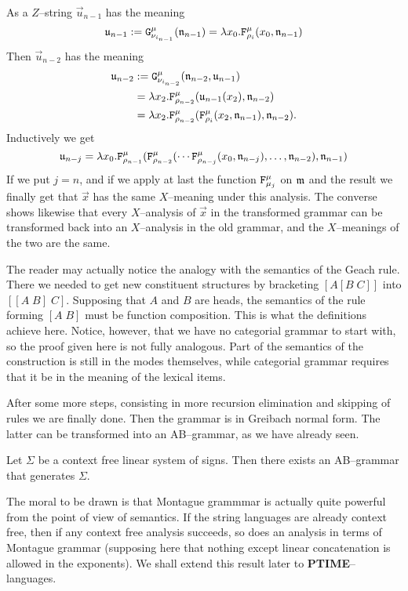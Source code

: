 As a $Z$--string $\vec{u}_{n-1}$ has the meaning
\begin{equation}
\mathfrak{u}_{n-1} :=
    \mbox{\tt G}^{\mu}_{\nu_{i_{n-1}}}(\mathfrak{n}_{n-1}) =
    \lambda x_0.\mbox{\tt F}^{\mu}_{\rho_i}(x_0, \mathfrak{n}_{n-1}) 
\end{equation}
Then $\vec{u}_{n-2}$ has the meaning
\begin{align}
\begin{split}
\Gu_{n-2} & := \mbox{\tt G}^{\mu}_{\nu_{i_{n-2}}}(\Gn_{n-2},\Gu_{n-1}) \\
    & = \lambda x_2.\mbox{\tt F}^{\mu}_{\rho_{n-2}}(\Gu_{n-1}(x_2),
        \Gn_{n-2}) \\
    & = \lambda x_2.\mbox{\tt F}^{\mu}_{\rho_{n-2}}(%
    \mbox{\tt F}^{\mu}_{\rho_i}(x_2, \Gn_{n-1}),\Gn_{n-2}).
\end{split}
\end{align}
Inductively we get
\begin{equation}
\Gu_{n-j} =
    \lambda x_0.\mbox{\tt F}^{\mu}_{\rho_{n-1}}(%
    \mbox{\tt F}^{\mu}_{\rho_{n-2}}(\dotsb
    \mbox{\tt F}^{\mu}_{\rho_{n-j}}(
    x_0, \Gn_{n-j}), \dotsc, \Gn_{n-2}),\Gn_{n-1})
\end{equation}
If we put $j = n$, and if we apply at last the function
$\mbox{\tt F}^{\mu}_{\mu_j}$ on $\mathfrak{m}$ and the result
we finally get that $\vec{x}$ has the same $X$--meaning
under this analysis. The converse shows likewise that
every $X$--analysis of $\vec{x}$ in the transformed
grammar can be transformed back into an $X$--analysis
in the old grammar, and the $X$--meanings of the two
are the same.

The reader may actually notice the analogy with the semantics
of the Geach rule. There we needed to get new constituent
structures by bracketing $[A [B\; C]]$ into $[[A\; B]\; C]$.
Supposing that $A$ and $B$ are heads, the semantics of the
rule forming $[A\; B]$ must be function composition. This is
what the definitions achieve here. Notice, however, that we
have no categorial grammar to start with, so the proof given
here is not fully analogous. Part of the semantics of the
construction is still in the modes themselves, while categorial
grammar requires that it be in the meaning of the lexical
items.

After some more steps, consisting in more recursion
elimination and skipping of rules we are finally done.
Then the grammar is in Greibach normal form. The latter
can be transformed into an AB--grammar, as we have already 
seen.
\begin{thm}
Let $\Sigma$ be a context free linear system of signs.
Then there exists an AB--grammar that
generates $\Sigma$.
\end{thm}
The moral to be drawn is that Montague grammmar is actually
quite powerful from the point of view of semantics. If the string
languages are already context
free, then if any context free analysis succeeds, so does
an analysis in terms of Montague grammar (supposing here
that nothing except linear concatenation is allowed in the
exponents). We shall extend this result later to
\textbf{PTIME}--languages.

